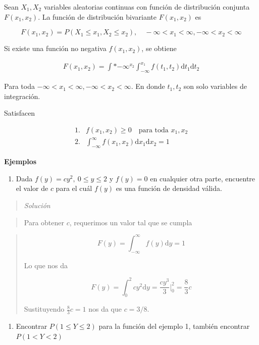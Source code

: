 \documentclass[
  letterpaper,
  DIV=11,
  numbers=noendperiod]{scrartcl}
\providecommand{\tightlist}{%
  \setlength{\itemsep}{0pt}\setlength{\parskip}{0pt}}\usepackage{longtable,booktabs,array}
\begin{document}
Sean \(X_1, X_2\) variables aleatorias continuas con función de
distribución conjunta \(F(x_1, x_2)\). La función de distribución
bivariante \(F(x_1, x_2)\) es

\[
  F(x_1, x_2) = P(X_1 \leq x_1, X_2 \leq x_2),\quad -\infty < x_1 < \infty, -\infty < x_2<\infty
\]

Si existe una función no negativa \(f(x_1, x_2)\), se obtiene

\begin{align*}
F(x_1, x_2) = \int*{-\infty}^{x_2} \int_{-\infty}^{x_1} f(t_1, t_2)\text{d}t_1\text{d}t_2
\end{align*}

Para toda \(-\infty < x_1<\infty, -\infty < x_2<\infty\). En donde
\(t_1, t_2\) son solo variables de integración.

Satisfacen

\begin{align*}
1. &f(x_1, x_2)\geq 0\quad \text{para toda }x_1, x_2\\
2. &\int_{-\infty}^\infty f(x_1, x_2) \text{d}x_1\text{d}x_2= 1
\end{align*}

\textbf{Ejemplos}

\begin{enumerate}
\def\labelenumi{\arabic{enumi}.}
\tightlist
\item
  Dada \(f(y) = cy^2,\ 0 \leq y \leq 2\) y \(f(y)=0\) en cualquier otra
  parte, encuentre el valor de \(c\) para el cuál \(f(y)\) es una
  función de densidad válida.
\end{enumerate}

\begin{quote}
\emph{Solución}
\end{quote}

\begin{quote}
Para obtener \(c\), requerimos un valor tal que se cumpla
\end{quote}

\begin{quote}
\[
 F(y) = \int_{-\infty}^\infty f(y)\text{d}y = 1
\]

Lo que nos da

\[
 F(y) = \int_0^2 cy^2\text{d}y=\frac{cy^3}{3} \Bigg|_0^2=\frac{8}{3}c
\]

Sustituyendo \(\frac{8}{3}c=1\) nos da que \(c=3/8\).
\end{quote}

\begin{enumerate}
\def\labelenumi{\arabic{enumi}.}
\setcounter{enumi}{1}
\tightlist
\item
  Encontrar \(P(1\leq Y \leq 2)\) para la función del ejemplo 1, también
  encontrar \(P(1< Y < 2)\)
\end{enumerate}
\end{document}
